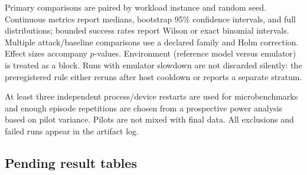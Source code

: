 Primary comparisons are paired by workload instance and random seed. Continuous metrics report medians, bootstrap 95\% confidence intervals, and full distributions; bounded success rates report Wilson or exact binomial intervals. Multiple attack/baseline comparisons use a declared family and Holm correction. Effect sizes accompany $p$-values. Environment (reference model versus emulator) is treated as a block. Runs with emulator slowdown are not discarded silently: the preregistered rule either reruns after host cooldown or reports a separate stratum.

At least three independent process/device restarts are used for microbenchmarks and enough episode repetitions are chosen from a prospective power analysis based on pilot variance. Pilots are not mixed with final data. All exclusions and failed runs appear in the artifact log.

\subsection{Pending result tables}

\begin{table}[t]
\centering
\caption{\textbf{Placeholder / expected trend only; replace with actual experimental results before submission.} No numeric outcomes are populated.}
\label{tab:pending-security}
\small
{}
\end{table}

